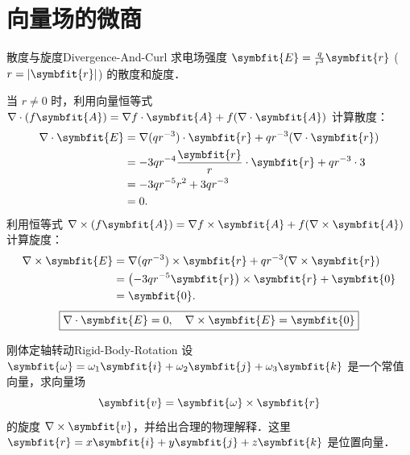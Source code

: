 \section{向量场的微商}

\begin{problem}{散度与旋度}{Divergence-And-Curl}
    求电场强度 $\symbfit{E} = \frac{q}{r^3} \symbfit{r}$ ($r = |\symbfit{r}|$) 的散度和旋度．
\end{problem}

\begin{solution}
    当 $r \neq 0$ 时，利用向量恒等式 $\nabla \cdot (f \symbfit{A}) = \nabla f \cdot \symbfit{A} + f (\nabla \cdot \symbfit{A})$ 计算散度：
    \begin{equation}
        \begin{aligned}
            \nabla \cdot \symbfit{E} & = \nabla (q r^{-3}) \cdot \symbfit{r} + q r^{-3} (\nabla \cdot \symbfit{r}) \\
                                     & = -3q r^{-4} \frac{\symbfit{r}}{r} \cdot \symbfit{r} + q r^{-3} \cdot 3     \\
                                     & = -3q r^{-5} r^2 + 3q r^{-3}                                                \\
                                     & = 0.
        \end{aligned} \label{eq:divergence-calc}
    \end{equation}
    利用恒等式 $\nabla \times (f \symbfit{A}) = \nabla f \times \symbfit{A} + f (\nabla \times \symbfit{A})$ 计算旋度：
    \begin{equation}
        \begin{aligned}
            \nabla \times \symbfit{E} & = \nabla (q r^{-3}) \times \symbfit{r} + q r^{-3} (\nabla \times \symbfit{r}) \\
                                      & = \left( -3q r^{-5} \symbfit{r} \right) \times \symbfit{r} + \symbfit{0}      \\
                                      & = \symbfit{0}.
        \end{aligned} \label{eq:curl-calc}
    \end{equation}
    \begin{equation}
        \boxed{\nabla \cdot \symbfit{E} = 0, \quad \nabla \times \symbfit{E} = \symbfit{0}}
    \end{equation}
\end{solution}

\begin{problem}{刚体定轴转动}{Rigid-Body-Rotation}
    设 $\symbfit{\omega} = \omega_1 \symbfit{i} + \omega_2 \symbfit{j} + \omega_3 \symbfit{k}$ 是一个常值向量，求向量场
    \begin{equation}
        \symbfit{v} = \symbfit{\omega} \times \symbfit{r}
    \end{equation}
    的旋度 $\nabla \times \symbfit{v}$，并给出合理的物理解释．这里 $\symbfit{r} = x \symbfit{i} + y \symbfit{j} + z \symbfit{k}$ 是位置向量．
\end{problem}

